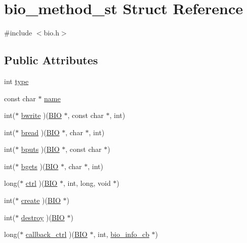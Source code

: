 \hypertarget{structbio__method__st}{}\section{bio\+\_\+method\+\_\+st Struct Reference}
\label{structbio__method__st}


{\ttfamily \#include $<$bio.\+h$>$}

\subsection*{Public Attributes}
\begin{DoxyCompactItemize}
\item 
int \hyperlink{structbio__method__st_aa17907bd09e726ddc073966bdd224b5b}{type}
\item 
const char $\ast$ \hyperlink{structbio__method__st_af69506d10c7b6ee584d7ebf99a1b84ba}{name}
\item 
int($\ast$ \hyperlink{structbio__method__st_ae24e468c844e654724faccdc87d88a62}{bwrite} )(\hyperlink{bio_8h_af3fabae1c9af50b9312cdff41e11d1dd}{B\+IO} $\ast$, const char $\ast$, int)
\item 
int($\ast$ \hyperlink{structbio__method__st_aa92125381017c6b2641439943cce9072}{bread} )(\hyperlink{bio_8h_af3fabae1c9af50b9312cdff41e11d1dd}{B\+IO} $\ast$, char $\ast$, int)
\item 
int($\ast$ \hyperlink{structbio__method__st_a733f66ebc2d8c513c6a286ffbc629428}{bputs} )(\hyperlink{bio_8h_af3fabae1c9af50b9312cdff41e11d1dd}{B\+IO} $\ast$, const char $\ast$)
\item 
int($\ast$ \hyperlink{structbio__method__st_a8fae124b9b9854cb1dfbee68db660b30}{bgets} )(\hyperlink{bio_8h_af3fabae1c9af50b9312cdff41e11d1dd}{B\+IO} $\ast$, char $\ast$, int)
\item 
long($\ast$ \hyperlink{structbio__method__st_ad0b4e0005a2dc107eb04a0dbec8f26b6}{ctrl} )(\hyperlink{bio_8h_af3fabae1c9af50b9312cdff41e11d1dd}{B\+IO} $\ast$, int, long, void $\ast$)
\item 
int($\ast$ \hyperlink{structbio__method__st_a79d9b2836d02d86c8aaf859093e5a3f5}{create} )(\hyperlink{bio_8h_af3fabae1c9af50b9312cdff41e11d1dd}{B\+IO} $\ast$)
\item 
int($\ast$ \hyperlink{structbio__method__st_a082d42c342cf11044b9a634ae96a4c94}{destroy} )(\hyperlink{bio_8h_af3fabae1c9af50b9312cdff41e11d1dd}{B\+IO} $\ast$)
\item 
long($\ast$ \hyperlink{structbio__method__st_a6b1b0a905468bba2ee191ae0401a65a3}{callback\+\_\+ctrl} )(\hyperlink{bio_8h_af3fabae1c9af50b9312cdff41e11d1dd}{B\+IO} $\ast$, int, \hyperlink{bio_8h_af5a44f8335db9b99313117d56add298c}{bio\+\_\+info\+\_\+cb} $\ast$)
\end{DoxyCompactItemize}


